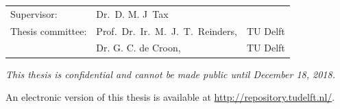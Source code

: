 \begin{titlepage}
\begin{center}
		\begin{tabular}{lll}
			Supervisor: & Dr.\ D. M. J\ Tax \\
			Thesis committee:
			& Prof.\ Dr.\ Ir.\ M.\ J.\ T.\ Reinders, & TU Delft \\
			& Dr. G. C. de Croon, & TU Delft \\

		\end{tabular}
		
		\bigskip
		\bigskip
		\emph{This thesis is confidential and cannot be made public until December 18, 2018.}
		
		\bigskip
		\bigskip
		An electronic version of this thesis is available at \url{http://repository.tudelft.nl/}.
		
	\end{center}
	
\end{titlepage}

